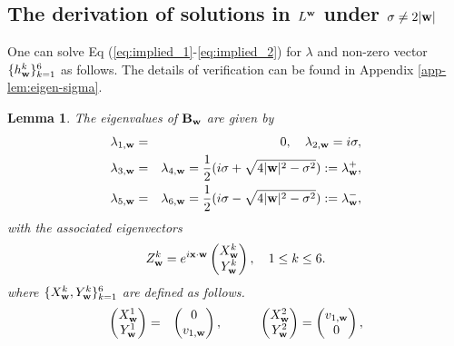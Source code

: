 \documentclass[10pt,reqno]{amsart}
\renewcommand{\(}{\left(}
\renewcommand{\)}{\right)}
\newcommand{\bw}{{\bf w}}
\newcommand{\BB}{{\bf B}}
\newcommand{\bx}{\mathbf{x}}
\newtheorem{lem}[theo]{Lemma}
\numberwithin{equation}{section}
\begin{document}
\subsection{The derivation of solutions in $L^{\bw}$ under $\sigma\neq 2|\bw|$}\label{subsection-general}
One can solve Eq (\ref{eq:implied_1}-\ref{eq:implied_2}) for $\lambda$ and non-zero vector $\{h^k_{\bw}\}_{k=1}^6$ as follows. The details of verification can be found in Appendix \ref{app-lem:eigen-sigma}.
\begin{lem}\label{lem:eigen-sigma}
	The eigenvalues of $\BB_{\bw}$ are given by  
	\begin{eqnarray}
		\lambda_{1,\bw} &=&0, \quad \lambda_{2,\bw} = i\sigma, \label{def:lambda_12}\\
		\lambda_{3,\bw}&=&\lambda_{4,\bw}=\frac{1}{2}(i\sigma +\sqrt{4|\bw|^2-\sigma^2}):=\lambda^+_{\bw}, \label{def:lambda_34}\\
		\lambda_{5,\bw}&=&\lambda_{6,\bw}=\frac{1}{2}(i\sigma -\sqrt{4|\bw|^2-\sigma^2}):=\lambda^-_{\bw}, \label{def:lambda_56}
	\end{eqnarray}
	with the  associated eigenvectors 
	\begin{equation}\label{def:zkw}
	Z^k_{\bw}= e^{i\bx\cdot \bw}\begin{pmatrix}
		X^k_{\bw}  \\
		Y^k_{\bw} 
	\end{pmatrix}, \quad 1\le k\le 6.  
	\end{equation}
	where $\{X^k_{\bw},Y^k_{\bw}\}_{k=1}^6$ are defined as follows.
	\begin{eqnarray*}
		\begin{pmatrix}
			X^1_{\bw}  \\
			Y^1_{\bw} 
		\end{pmatrix} &=& \begin{pmatrix}
			0  \\
			v_{1,\bw} 
		\end{pmatrix}, \quad \quad \quad 	
		\begin{pmatrix}
			X^2_{\bw}  \\ 
			Y^2_{\bw} 
		\end{pmatrix} =\begin{pmatrix}
			v_{1,\bw}  \\
			0
		\end{pmatrix}, \nonumber\\	

\end{eqnarray*}
\end{lem}
\end{document}
